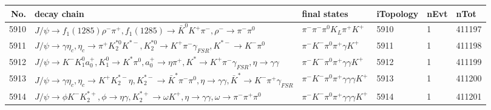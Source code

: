 \begin{table}[htbp] 
\begin{center}
\begin{small}
\begin{tabular}{rlllll}\hline\hline
 No. & decay chain & final states &  iTopology & nEvt & nTot \\\hline
5910&$J/\psi       \rightarrow f_{1}(1285)    \rho^{-}      \pi^{+}        , f_{1}(1285)     \rightarrow \bar{K}^{0}   K^{+}          \pi^{-}        , \rho^{-}       \rightarrow \pi^{-}        \pi^{0}        $&$\pi^{-}        \pi^{-}        \pi^{0}        K_{L}          \pi^{+}        K^{+}          $& 5910&    1&411197\\
5911&$J/\psi       \rightarrow \gamma       \eta_{c}    , \eta_{c}     \rightarrow \pi^{+}        K_2^{*0}       K^{*-}         , K_2^{*0}        \rightarrow K^{+}          \pi^{-}        \gamma_{FSR} , K^{*-}          \rightarrow K^{-}          \pi^{0}        $&$\pi^{-}        K^{-}          \pi^{0}        \pi^{+}        \gamma       K^{+}          $& 5911&    1&411198\\
5912&$J/\psi       \rightarrow K^{-}          K_1^{0}        a_{0}^{+}      , K_1^{0}         \rightarrow K^{*}          \pi^{0}        , a_{0}^{+}       \rightarrow \eta          \pi^{+}        , K^{*}           \rightarrow K^{+}          \pi^{-}        \gamma_{FSR} , \eta           \rightarrow \gamma       \gamma       $&$\pi^{-}        K^{-}          \pi^{0}        \pi^{+}        \gamma       \gamma       K^{+}          $& 5912&    1&411199\\
5913&$J/\psi       \rightarrow \gamma       \eta_{c}    , \eta_{c}     \rightarrow K^{+}          K_2^{*-}       \eta          , K_2^{*-}        \rightarrow \bar{K}^{*}   \pi^{-}        \pi^{0}        , \eta           \rightarrow \gamma       \gamma       , \bar{K}^{*}    \rightarrow K^{-}          \pi^{+}        \gamma_{FSR} $&$\pi^{-}        K^{-}          \pi^{0}        \pi^{+}        \gamma       \gamma       \gamma       K^{+}          $& 5913&    1&411200\\
5914&$J/\psi       \rightarrow \phi           K^{-}          K_2^{*+}       , \phi            \rightarrow \eta          \gamma       , K_2^{*+}        \rightarrow \omega         K^{+}          , \eta           \rightarrow \gamma       \gamma       , \omega          \rightarrow \pi^{-}        \pi^{+}        \pi^{0}        $&$\pi^{-}        K^{-}          \pi^{0}        \pi^{+}        \gamma       \gamma       \gamma       K^{+}          $& 5914&    1&411201\\

\end{tabular}
\end{small}
\end{center}
\end{table}
